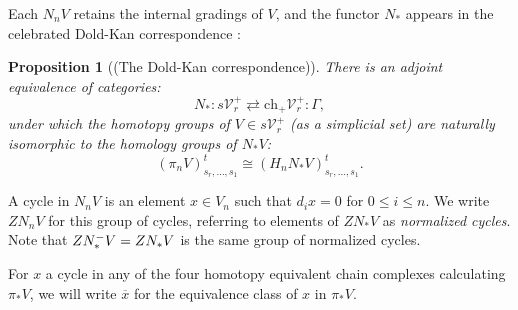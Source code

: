 \documentclass[11pt]{amsart} \renewcommand{\baselinestretch}{1.2}
\theoremstyle{plain}
\newtheorem{prop}[thm]{Proposition}
\numberwithin{equation}{section} %
\theoremstyle{plain}
\newtheorem{prop}[thm]{Proposition}
\numberwithin{equation}{chapter} %
\newcommand{\calV}{\mathcal{V}}
\newcommand{\citeBOX}[2][]{\cite[\mbox{#1}]{#2}}
\newcommand{\vect}[2]{\calV^{#1}_{#2}}
\newcommand{\Nop}{N^{\smash{-}}}
\newcommand{\complexes}{\mathrm{ch}_+}
\begin{document}
\begin{Conventions and notation}
Each $N_nV$ retains the internal gradings of $V$, and the functor $N_*$ appears in the celebrated  Dold-Kan correspondence {\citeBOX[\S III.2]{goerss-jardine.pdf}}:
\begin{prop}[(The Dold-Kan correspondence)]
There is an adjoint equivalence of categories:
\[N_*:s\vect{+}{r}\rightleftarrows \complexes \vect{+}{r}:\Gamma,\]
under which the homotopy groups of $V\in s\vect{+}{r}$ (as a simplicial set)  are naturally isomorphic to the homology groups of $N_*V$:
\[(\pi_n V)_{s_r,\ldots,s_1}^t\cong (H_n N_*V)_{s_r,\ldots,s_1}^t.\]
\end{prop}


%
A cycle in $N_nV$ is an element $x\in V_n$ such that $d_ix=0$ for $0\leq i\leq n$. We write $ZN_nV$ for this group of cycles, referring to elements of $ZN_*V$ as \emph{normalized cycles}. Note that $Z\Nop_*V=ZN_*V$ is the same group of normalized cycles.

For $x$ a cycle in any of the four homotopy equivalent chain complexes calculating $\pi_*V$, we will write $\overline{x}$ for the equivalence class of $x$ in $\pi_*V$.


\end{Conventions and notation}
\end{document}
